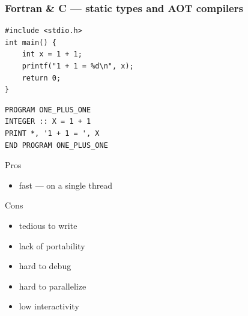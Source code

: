 \documentclass[
    xcolor={svgnames,dvipsnames},
    hyperref={colorlinks, citecolor=DeepPink4, linkcolor=DarkRed, urlcolor=DarkBlue}
    ]{beamer}  %
\newcommand{\1}{\mathbbm 1}
\begin{document}
\begin{frame}[fragile]
    \frametitle{Fortran \& C --- static types and AOT compilers}

    {\small
    \begin{verbatim}
#include <stdio.h>
int main() {
    int x = 1 + 1;
    printf("1 + 1 = %d\n", x);
    return 0;
}   
    \end{verbatim}
    }


    {\small
    \begin{verbatim}
PROGRAM ONE_PLUS_ONE  
INTEGER :: X = 1 + 1 
PRINT *, '1 + 1 = ', X
END PROGRAM ONE_PLUS_ONE 
    \end{verbatim}
    }

\end{frame}


\begin{frame}
    

    Pros

    \begin{itemize}
        \item fast  --- on a single thread
    \end{itemize}


    \vspace{0.5em}

    Cons

    \begin{itemize}
        \item tedious to write
        \item lack of portability
        \item hard to debug
        \item hard to parallelize
        \item low interactivity
    \end{itemize}

\end{frame}
\end{document}
